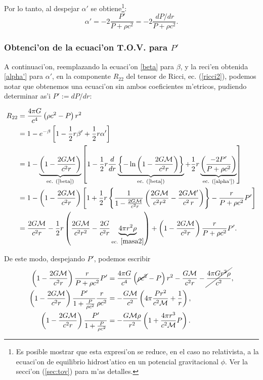 Por lo tanto, al despejar $\alpha'$ se obtiene\footnote{Es posible mostrar que esta expresi'on se reduce, en el caso no relativista, a la ecuaci'on de equilibrio hidrost'atico en un potencial gravitacional $\phi$. Ver la secci'on (\ref{sec:tov}) para m'as detalles.}:
\begin{equation}\label{alpha'}
 \alpha'=-2\frac{P'}{P+\rho c^2}=-2\frac{\,dP/dr}{P+\rho c^2}.
\end{equation}


\subsubsection{Obtenci'on de la ecuaci'on T.O.V. para \texorpdfstring{$P'$}{P}}
A continuaci'on, reemplazando la ecuaci'on \eqref{beta} para $\beta$, y la reci'en obtenida \eqref{alpha'} para $\alpha'$,  en la componente $R_{22}$ del tensor de Ricci, ec. (\ref{ricci2}), podemos notar que obtenemos una ecuaci'on sin ambos coeficientes m'etricos, pudiendo determinar as'i $P':=dP/dr:$

\begin{align}
 R_{22}&=\frac{4\pi G}{c^{4}}\left( \rho  c^2-P\right)r^2\\
&=1-e^{-\beta}\left[1-\frac{1}{2}r\beta'+\frac{1}{2}r\alpha'\right]\\
&=1-\underbrace{\left(1-\frac{2G\mathcal{M}}{c^2r}\right)}_{\text{ec. (\ref{beta})}}\left[1-\frac{1}{2}r\frac{d}{dr}\underbrace{\left\{-\ln\left(1-\frac{2G\mathcal{M}}{c^2r}\right)\right\}}_{\text{ec. (\ref{beta})}}+\frac{1}{2}r\underbrace{\left(\frac{-2P'}{P+\rho c^2}\right)}_{\text{ec. (\ref{alpha'})}}\right]\\
&=1-\left(1-\frac{2G\mathcal{M}}{c^2r}\right)\left[1+\frac{1}{2}r\left\{\frac{1}{1-\frac{2G\mathcal{M}}{c^2r}}\left(\frac{2G\mathcal{M}}{c^2r^2}-\frac{2G\mathcal{M}'}{c^2\,r}\right)\right\}-\frac{r}{P+\rho c^2}P'\right]\\
&=\frac{2G\mathcal{M}}{c^2r}-\frac{1}{2}r\left(\frac{2G\mathcal{M}}{c^2r^2}-\frac{2G}{c^2r}\underbrace{4\pi r^2\rho}_{\text{ec. } \eqref{masa2}}\right)+\left(1-\frac{2G\mathcal{M}}{c^2r}\right)\frac{r}{P+\rho c^2}P'.
\end{align}

De este modo, despejando $P'$, podemos escribir
\begin{align}
 \left(1-\frac{2G\mathcal{M}}{c^2r}\right)\frac{r}{P+\rho c^2}P'&=\frac{4\pi G}{c^{4}}\left( \cancel{\rho c^2}-P\right)r^2-\frac{G\mathcal{M}}{c^2 r}-\cancel{\frac{4\pi Gr^2\rho}{c^2}},\\
\left(1-\frac{2G\mathcal{M}}{c^2r}\right)\frac{P'}{1+\frac{P}{\rho c^2}}\frac{r}{\rho c^2}&=-\frac{G\mathcal{M}}{c^2}\left(4\pi \frac{P r^2}{c^2\mathcal{M}}+\frac{1}{r}\right),\\
\left(1-\frac{2G\mathcal{M}}{c^2r}\right)\frac{P'}{1+\frac{P}{\rho c^2}}&=-\frac{G\mathcal{M}\rho}{r^2}\left(1+\frac{4\pi r^3}{c^2 \mathcal{M}}P\right).
\end{align}

